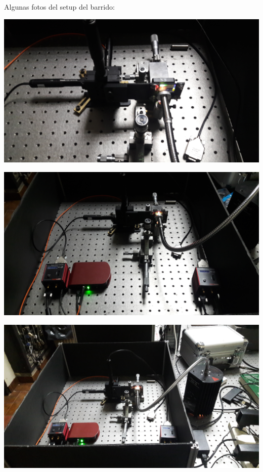 \documentclass[12pt,dvipsnames]{exam}
\begin{document}
Algunas fotos del setup del barrido:

\begin{center}
	\includegraphics[scale=0.1]{imgs/setup_barrido/1.jpg}
\end{center}

\begin{center}
	\includegraphics[scale=0.1]{imgs/setup_barrido/2.jpg}
\end{center}

\begin{center}
	\includegraphics[scale=0.1]{imgs/setup_barrido/3.jpg}
\end{center}
\end{document}
